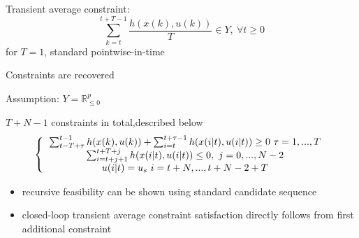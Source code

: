 Transient average constraint:
\begin{equation*}
\sum_{k=t}^{t+T-1}\frac{h(x(k),u(k))}{T} \in Y, \ \forall t \geq 0
\end{equation*}
for $T=1$, standard pointwise-in-time 

Constraints are recovered

Assumption: $Y= \mathbb{R}^p_{\leq 0}$


$T+N-1$ constraints in total,described below
\begin{equation*}
\left \{
\begin{tabular}{c} 
$\sum_{t-T+\tau}^{t-1} h(x(k),u(k)) + \sum_{i=t}^{t+\tau -1}h(x(i|t), u(i|t)) \geq 0 \ \tau = 1, ..., T$ \\
$\sum_{i=t+j+1}^{t+T+j}h(x(i|t),u(i|t)) \leq 0, \ j =0, ..., N-2$ \\
$u(i|t) = u_s \ i = t+N, ... , t+N-2+T$ 
\end{tabular} 
\right .  
\end{equation*}

\begin{itemize}
\item recursive feasibility can be shown using standard candidate sequence
\item closed-loop transient average constraint satisfaction directly follows from first additional constraint
\end{itemize}
